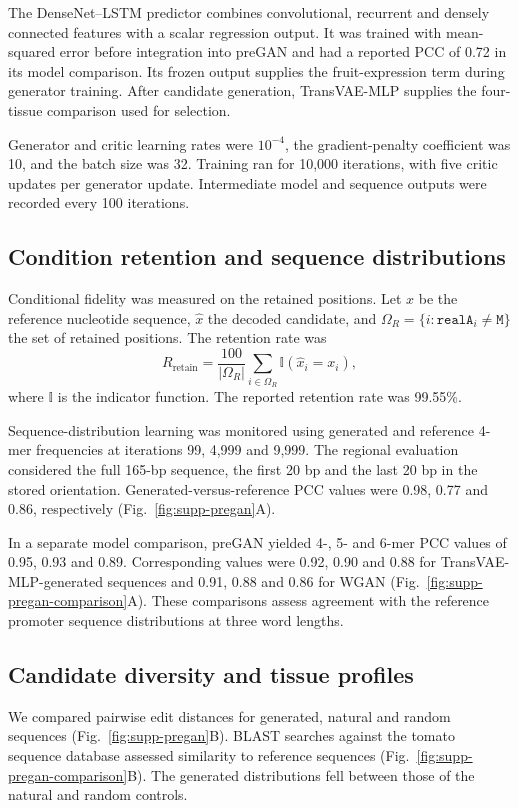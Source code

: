 \documentclass[10pt]{article}
\begin{document}
The DenseNet--LSTM predictor combines convolutional, recurrent and densely connected features with a scalar regression output. It was trained with mean-squared error before integration into preGAN and had a reported PCC of 0.72 in its model comparison. Its frozen output supplies the fruit-expression term during generator training. After candidate generation, TransVAE-MLP supplies the four-tissue comparison used for selection.

Generator and critic learning rates were $10^{-4}$, the gradient-penalty coefficient was 10, and the batch size was 32. Training ran for 10,000 iterations, with five critic updates per generator update. Intermediate model and sequence outputs were recorded every 100 iterations.

\subsection{Condition retention and sequence distributions}

Conditional fidelity was measured on the retained positions. Let $x$ be the reference nucleotide sequence, $\hat{x}$ the decoded candidate, and $\Omega_R=\{i:\texttt{realA}_i\ne\texttt{M}\}$ the set of retained positions. The retention rate was
\[
R_{\mathrm{retain}}=\frac{100}{|\Omega_R|}
\sum_{i\in\Omega_R}\mathbb{I}(\hat{x}_i=x_i),
\]
where $\mathbb{I}$ is the indicator function. The reported retention rate was 99.55\%.

Sequence-distribution learning was monitored using generated and reference 4-mer frequencies at iterations 99, 4,999 and 9,999. The regional evaluation considered the full 165-bp sequence, the first 20 bp and the last 20 bp in the stored orientation. Generated-versus-reference PCC values were 0.98, 0.77 and 0.86, respectively (Fig.~\ref{fig:supp-pregan}A).

In a separate model comparison, preGAN yielded 4-, 5- and 6-mer PCC values of 0.95, 0.93 and 0.89. Corresponding values were 0.92, 0.90 and 0.88 for TransVAE-MLP-generated sequences and 0.91, 0.88 and 0.86 for WGAN (Fig.~\ref{fig:supp-pregan-comparison}A). These comparisons assess agreement with the reference promoter sequence distributions at three word lengths.

\subsection{Candidate diversity and tissue profiles}

We compared pairwise edit distances for generated, natural and random sequences (Fig.~\ref{fig:supp-pregan}B). BLAST searches against the tomato sequence database assessed similarity to reference sequences (Fig.~\ref{fig:supp-pregan-comparison}B). The generated distributions fell between those of the natural and random controls.
\end{document}
